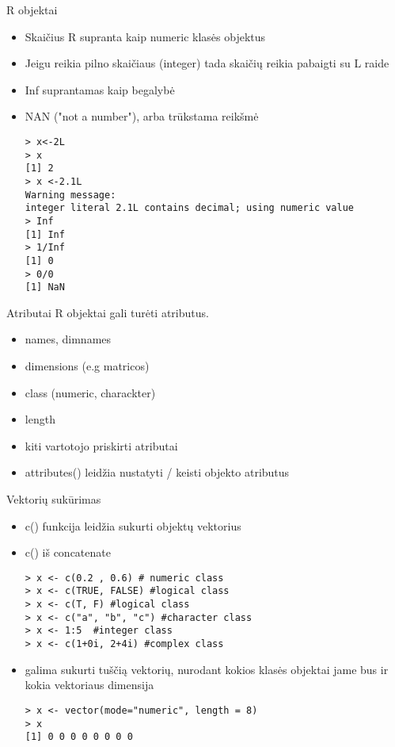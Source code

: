 \documentclass[11pt,xcolor=table]{beamer}
\begin{document}

\begin{frame}[fragile]{R objektai}
\begin{itemize}
\item Skaičius R supranta kaip numeric klasės objektus
\item Jeigu reikia pilno skaičiaus (integer) tada skaičių reikia pabaigti su L raide 
\item Inf suprantamas kaip begalybė
\item NAN ("not a number"), arba  trūkstama reikšmė
\begin{lstlisting}
> x<-2L
> x
[1] 2
> x <-2.1L
Warning message:
integer literal 2.1L contains decimal; using numeric value 
> Inf
[1] Inf
> 1/Inf
[1] 0
> 0/0
[1] NaN
\end{lstlisting}
\end{itemize}
\end{frame}


\begin{frame}[fragile]{Atributai}
R objektai gali turėti atributus.
\begin{itemize}
\item names, dimnames
\item dimensions (e.g matricos)
\item class (numeric, charackter)
\item length
\item kiti vartotojo priskirti atributai
\item attributes() leidžia nustatyti / keisti objekto atributus
\end{itemize}
\end{frame}


\begin{frame}[fragile]{Vektorių sukūrimas}

\begin{itemize}
\item c() funkcija leidžia sukurti objektų vektorius 
\item c() iš concatenate 
\begin{lstlisting}
> x <- c(0.2 , 0.6) # numeric class
> x <- c(TRUE, FALSE) #logical class
> x <- c(T, F) #logical class
> x <- c("a", "b", "c") #character class
> x <- 1:5  #integer class
> x <- c(1+0i, 2+4i) #complex class
\end{lstlisting}
\item galima sukurti tuščią vektorių, nurodant kokios klasės objektai jame bus ir kokia vektoriaus dimensija
\begin{lstlisting}
> x <- vector(mode="numeric", length = 8)
> x
[1] 0 0 0 0 0 0 0 0
\end{lstlisting}
\end{itemize}
\end{frame}
\end{document}
